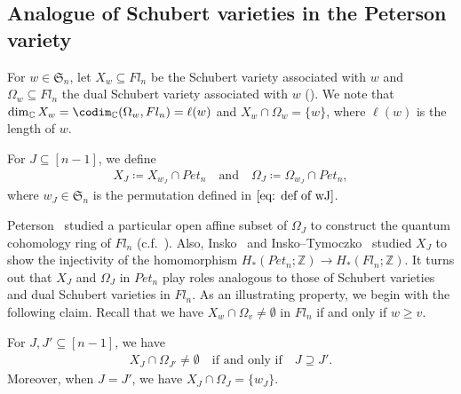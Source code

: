 \subsection{Analogue of Schubert varieties in the Peterson variety}
For $w\in \mathfrak{S}_n$, 
let $X_{w}\subseteq Fl_n$ be the Schubert variety associated with $w$ and $\Omega_w\subseteq Fl_n$ the dual Schubert variety associated with $w$ (\cite[Sect.~10]{fult97}).
We note that $\dim_{{\mathbb C}} X_{w} =\codim_{{\mathbb C}} (\Omega_w,Fl_n)= \ell(w)$ and $X_w\cap \Omega_w=\{w\}$, where $\ell(w)$ is the length of $w$.
\begin{defi}
For $J\subseteq [n-1]$, we define
\begin{equation}
\begin{split}\label{eq: subavr 10}
X_{J} 
\coloneqq X_{w_J}\cap Pet_{n} \quad \text{and} \quad \Omega_{J} 
\coloneqq \Omega_{w_J}\cap Pet_{n},
\end{split}
\end{equation}
where $w_J\in\mathfrak{S}_n$ is the permutation defined in $\eqref{eq: def of wJ}$.
\end{defi}

Peterson~\cite{Peterson} studied a particular open affine subset of $\Omega_J$ to construct the quantum cohomology ring of $Fl_n$ (c.f.~\cite{Kostant,Rietsch06}). Also, Insko~\cite{Insko} and Insko--Tymoczko~\cite{Insko-Tymoczko} studied $X_J$ to show the injectivity of the homomorphism $H_*(Pet_{n};{\mathbb Z})\rightarrow H_*(Fl_n;{\mathbb Z})$. It turns out that $X_J$ and $\Omega_J$ in $Pet_{n}$ play roles analogous to those of Schubert varieties and dual Schubert varieties in $Fl_n$. As an illustrating property, we begin with the following claim. Recall that we have $X_{w}\cap \Omega_{v}\ne\emptyset$ in $Fl_n$ if and only if $w\ge v$. 

\begin{prop}\label{prop: point intersection 2}
For $J,J'\subseteq[n-1]$, we have
\begin{align*}
X_{J}\cap \Omega_{J'} \neq \emptyset
\quad \text{if and only if} \quad
J \supseteq J'.
\end{align*}
Moreover, when $J=J'$, we have $X_J \cap \Omega_J = \{w_{J}\}$.
\end{prop}


